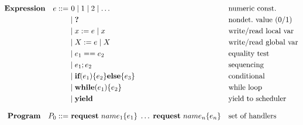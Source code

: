 \[
\begin{aligned}
	\mathbf{Expression}\quad e ::= &\ 0 \mid 1 \mid 2 \mid \dots            && \text{numeric const.}\\
	&\mid \textbf{?}                            && \text{nondet.\ value (0/1)}\\
	&\mid x := e \mid x                      && \text{write/read local var}\\
	&\mid X := e \mid X                      && \text{write/read global var}\\
	&\mid e_1 == e_2                         && \text{equality test}\\
	&\mid e_1 ; e_2                          && \text{sequencing}\\
	&\mid \textbf{if}(e_1)\{e_2\}\textbf{else}\{e_3\}    && \text{conditional}\\
	&\mid \textbf{while}(e_1)\{e_2\}               && \text{while loop}\\
	&\mid \textbf{yield}                           && \text{yield to scheduler}
	\\[0.8em]
	\mathbf{Program}\quad P_0 ::= &\ \textbf{request}\ name_1\{e_1\}\;\dots\;\textbf{request}\ name_n\{e_n\}
	&& \text{set of handlers} 
\end{aligned}
\]

